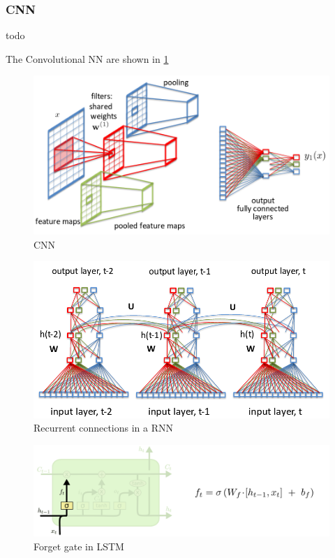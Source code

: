 \documentclass[conference]{IEEEtran}
\begin{document}
\subsubsection{CNN}
todo

The Convolutional NN are shown in \ref{fig:cnn}

\begin{figure}
    \includegraphics[width=.99\linewidth]{img/cnn.png}  
    \caption{CNN}
    \label{fig:cnn}
\end{figure}



\begin{figure}
    \includegraphics[width=.99\linewidth]{img/rnn.png}  
    \caption{Recurrent connections in a RNN}
    \label{fig:rnn}
\end{figure}

\begin{figure}
    \includegraphics[width=.99\linewidth]{img/lstm_forget.png}  
    \caption{Forget gate in LSTM} 
    \label{fig:lstm_forget}
\end{figure}
\end{document}

